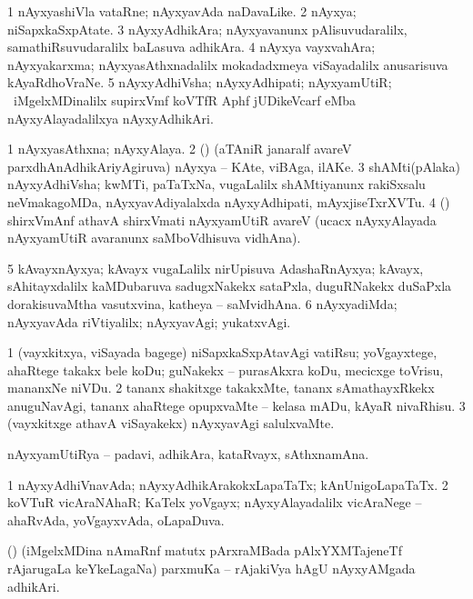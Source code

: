 \bentry
{}
\gl{\nA}
\bmng
\bnum
\num{1} nAyxyashiVla vataRne; nAyxyavAda naDavaLike. 
\num{2} nAyxya; niSapxkaSxpAtate. 
\num{3} nAyxyAdhikAra; nAyxyavanunx pAlisuvudaralilx, samathiRsuvudaralilx baLasuva adhikAra. 
\num{4} nAyxya vayxvahAra; nAyxyakarxma; nAyxyasAthxnadalilx mokadadxmeya viSayadalilx anusarisuva kAyaRdhoVraNe. 
\num{5} nAyxyAdhiVsha; nAyxyAdhipati; nAyxyamUtiR; \kanmu\ iMgelxMDinalilx supirxVmf koVTfR Aphf jUDikeVcarf eMba nAyxyAlayadalilxya nAyxyAdhikAri. 
\enum
\emng

\noindent
\gl{\pagu}
\bmng
\bnum
\num{1}  nAyxyasAthxna; nAyxyAlaya. 
\num{2}  (\ame) (aTAniR janaralf avareV parxdhAnAdhikAriyAgiruva) nAyxya -- KAte, viBAga, ilAKe. 
\num{3}  shAMti(pAlaka) nAyxyAdhiVsha; kwMTi, paTaTxNa, \mo vugaLalilx shAMtiyanunx rakiSxsalu neVmakagoMDa, nAyxyavAdiyalalxda nAyxyAdhipati, mAyxjiseTxrXVTu. 
\num{4}  (\birx) shirxVmAnf athavA shirxVmati nAyxyamUtiR avareV (ucacx nAyxyAlayada nAyxyamUtiR avaranunx saMboVdhisuva vidhAna). 
\num{5}  kAvayxnAyxya; kAvayx \mo vugaLalilx nirUpisuva AdashaRnAyxya; kAvayx, sAhitayxdalilx kaMDubaruva sadugxNakekx sataPxla, duguRNakekx duSaPxla dorakisuvaMtha vasutxvina, katheya -- saMvidhAna. 
\num{6}  nAyxyadiMda; nAyxyavAda riVtiyalilx; nAyxyavAgi; yukatxvAgi. 
\enum
\emng

\noindent
\gl{\nuga}
\bmng
\bnum
\num{1}    (vayxkitxya, viSayada bagege) niSapxkaSxpAtavAgi vatiRsu; yoVgayxtege, ahaRtege takakx bele koDu; guNakekx -- purasAkxra koDu, mecicxge toVrisu, mananxNe niVDu. 
\num{2}   tananx shakitxge takakxMte, tananx sAmathayxRkekx anuguNavAgi, tananx ahaRtege opupxvaMte -- kelasa mADu, kAyaR nivaRhisu. 
\num{3}    (vayxkitxge athavA viSayakekx) nAyxyavAgi salulxvaMte. 
\enum
\emng
\eentry

\bentry
{}
\gl{\nA}
\bmng
nAyxyamUtiRya -- padavi, adhikAra, kataRvayx, sAthxnamAna. 
\emng
\eentry

\bentry
{}
\gl{\gu}
\bmng
\bnum
\num{1} nAyxyAdhiVnavAda; nAyxyAdhikArakokxLapaTaTx; kAnUnigoLapaTaTx. 
\num{2} koVTuR vicAraNAhaR; KaTelx yoVgayx; nAyxyAlayadalilx vicAraNege -- ahaRvAda, yoVgayxvAda, oLapaDuva. 
\enum
\emng
\eentry

\bentry
{}
\gl{\nA}
\bmng
(\ca) (iMgelxMDina nAmaRnf matutx pArxraMBada pAlxYXMTajeneTf rAjarugaLa keYkeLagaNa) parxmuKa -- rAjakiVya hAgU nAyxyAMgada adhikAri. 
\emng
\eentry

